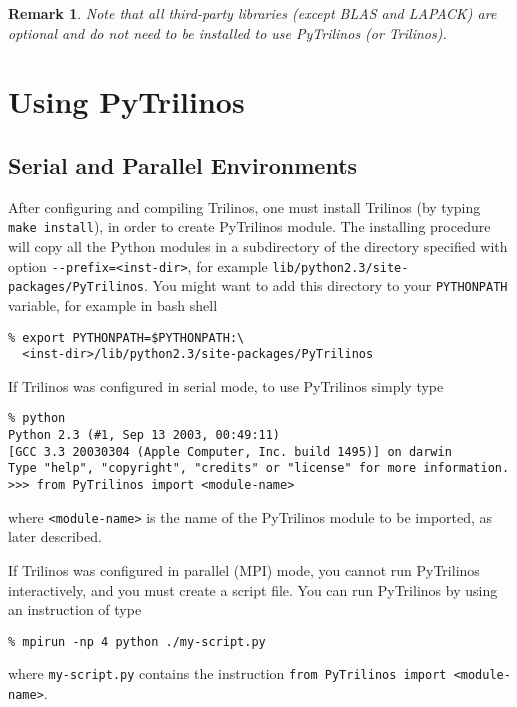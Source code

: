 \documentclass[10pt,relax]{SANDreport}
\newtheorem{remark}{Remark}
\begin{document}
\begin{remark}
Note that all third-party libraries (except BLAS and LAPACK) are optional and
do not need to be installed to use PyTrilinos (or Trilinos).
\end{remark}

\section{Using PyTrilinos}
\label{sec:using}

\subsection{Serial and Parallel Environments}
\label{sec:running}

After configuring and compiling Trilinos, one must install Trilinos 
(by typing \verb!make install!), in order to create PyTrilinos module.
The installing procedure will copy all the Python modules in a subdirectory of
the directory specified with option \verb!--prefix=<inst-dir>!, for example
\verb!lib/python2.3/site-packages/PyTrilinos!. You might want to add this
directory to your \verb!PYTHONPATH! variable, for example in bash shell
\begin{verbatim}
% export PYTHONPATH=$PYTHONPATH:\
  <inst-dir>/lib/python2.3/site-packages/PyTrilinos
\end{verbatim}

If Trilinos was configured in serial mode, to use PyTrilinos  simply type
\begin{verbatim}
% python
Python 2.3 (#1, Sep 13 2003, 00:49:11) 
[GCC 3.3 20030304 (Apple Computer, Inc. build 1495)] on darwin
Type "help", "copyright", "credits" or "license" for more information.
>>> from PyTrilinos import <module-name>
\end{verbatim}
where \verb!<module-name>! is the name of the PyTrilinos module to be
imported, as later described.

If Trilinos was configured in parallel (MPI) mode, you cannot run PyTrilinos
interactively, and you must create a script file. You can run PyTrilinos by
using an instruction of type
\begin{verbatim}
% mpirun -np 4 python ./my-script.py
\end{verbatim}
where \verb!my-script.py! contains the instruction \verb!from PyTrilinos import <module-name>!.
\end{document}
